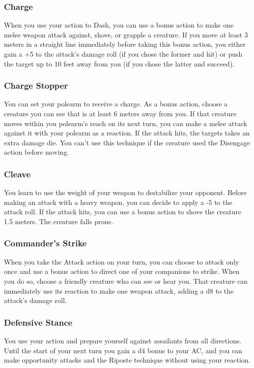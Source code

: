 \subsubsection{Charge} \label{tec::charge}
When you use your action to Dash, you can use a bonus action to make one melee weapon attack against, shove, or grapple a creature.
If you move at least 3 meters in a straight line immediately before taking this bonus action, you either gain a +5 to the attack's damage roll (if you chose the former and hit) or push the target up to 10 feet away from you (if you chose the latter and succeed).

\subsubsection{Charge Stopper} \label{tec::chargestopper}
You can set your polearm to receive a charge.
As a bonus action, choose a creature you can see that is at least 6 meters away from you.
If that creature moves within you polearm's reach on its next turn, you can make a melee attack against it with your polearm as a reaction.
If the attack hits, the targets takes an extra damage die.
You can't use this technique if the creature used the Disengage action before moving.

\subsubsection{Cleave} \label{tec::cleave}
You learn to use the weight of your weapon to destabilize your opponent.
Before making an attack with a heavy weapon, you can decide to apply a -5 to the attack roll.
If the attack hits, you can use a bonus action to shove the creature 1.5 meters.
The creature falls prone.

\subsubsection{Commander's Strike} \label{tec::commandersstrike}
When you take the Attack action on your turn, you can choose to attack only once and use a bonus action to direct one of your companions to strike.
When you do so, choose a friendly creature who can see or hear you.
That creature can immediately use its reaction to make one weapon attack, adding a d8 to the attack's damage roll.

\subsubsection{Defensive Stance} \label{tec::defensivestance}
You use your action and prepare yourself against assailants from all directions.
Until the start of your next turn you gain a d4 bonus to your AC, and you can make opportunity attacks and the Riposte technique without using your reaction.

